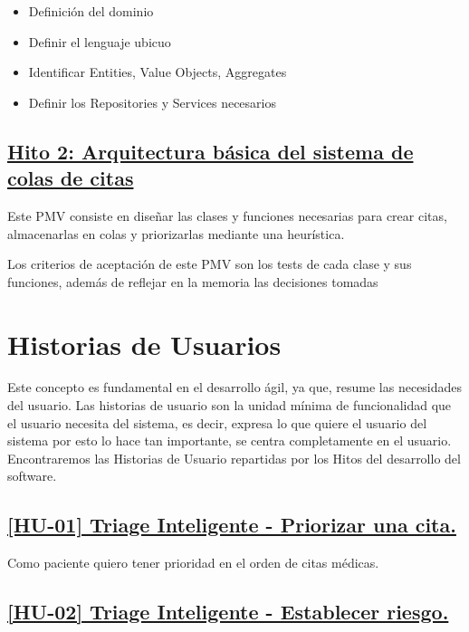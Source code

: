 \begin{itemize}
    \item {Definición del dominio}
    \item {Definir el lenguaje ubicuo}
    \item {Identificar Entities, Value Objects, Aggregates}
    \item {Definir los Repositories y Services necesarios}
\end{itemize}


\subsection*{\href{https://github.com/RubenDelgadoPareja/TFG-Triage-Inteligente-Consulta-Medica/milestone/2}{Hito 2: Arquitectura básica del sistema de colas de citas}}

Este PMV consiste en diseñar las clases y funciones necesarias para crear citas, almacenarlas en colas y priorizarlas mediante una heurística.

Los criterios de aceptación de este PMV son los tests de cada clase y sus funciones, además de reflejar en la memoria las decisiones tomadas

\section{Historias de Usuarios}
Este concepto es fundamental en el desarrollo ágil, ya que, resume las necesidades del usuario.
Las historias de usuario son la unidad mínima de funcionalidad que el usuario necesita del sistema, es decir,
expresa lo que quiere el usuario del sistema por esto lo hace tan importante, se centra completamente en el
usuario. Encontraremos las Historias de Usuario repartidas por los Hitos del desarrollo del software.


\subsection*{\href{https://github.com/RubenDelgadoPareja/TFG-Triage-Inteligente-Consulta-Medica/issues/19}{[HU-01] Triage Inteligente - Priorizar una cita.}}

Como paciente quiero tener prioridad en el orden de citas médicas.

\subsection*{\href{https://github.com/RubenDelgadoPareja/TFG-Triage-Inteligente-Consulta-Medica/issues/5}{[HU-02] Triage Inteligente - Establecer riesgo.}}


